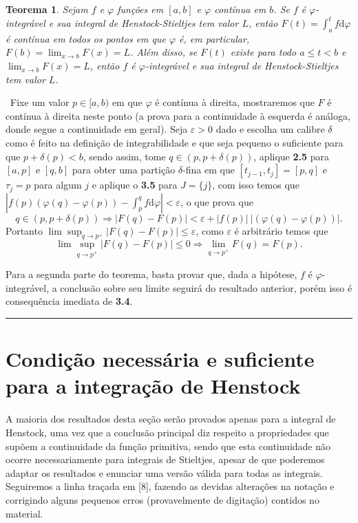 \documentclass[12pt, a4paper]{article}
\newtheorem{thrm}[mydef]{Teorema}
\def\dem{\par\smallbreak\noindent {\textit{ Demonstração:}} \ }
\def\eop{\hfill\rule{2.5mm}{2.5mm}}
\theoremstyle{definition}
\begin{document}
\begin{thrm}
	
	Sejam $f$ e $\varphi$ funções em $[a,b]$ e $\varphi$ contínua em $b$. Se $f$ é $\varphi$-integrável e sua integral de Henstock-Stieltjes tem valor $L$, então $F(t)=\int_a^t f  \text{d}\varphi $ é contínua em todos os pontos em que $\varphi$ é, em particular, $F(b)=\lim_{x\rightarrow b}F(x)=L$. Além disso, se $F(t)$ existe para todo $a\leq t <b$ e $\lim_{x\rightarrow b}F(x)=L$, então $f$ é  $\varphi$-integrável e sua integral de Henstock-Stieltjes tem valor $L$.  
	
\end{thrm}

\dem Fixe um valor $p\in [a,b)$ em que $\varphi$ é contínua à direita, mostraremos que $F$ é contínua à direita neste ponto (a prova para a continuidade à esquerda é análoga, donde segue a continuidade em geral). Seja $\varepsilon >0$ dado e escolha um calibre $\delta$ como é feito na definição de integrabilidade e que seja pequeno o suficiente para que $p+\delta(p)<b$, sendo assim, tome $q\in (p,p+\delta(p))$, aplique \textbf{2.5} para $[a,p]$ e $[q,b]$ para obter uma partição $\delta$-fina em que $[t_{j-1},t_j]=[p,q]$ e $\tau_j = p$ para algum $j$ e aplique o \textbf{3.5} para $J=\{j\}$, com isso temos que $\left|f(p)(\varphi(q)-\varphi(p)) - \int_p^q f  \text{d}\varphi \right| <\varepsilon $, o que prova que $$q\in (p,p+\delta(p)) \Rightarrow |F(q)-F(p)|<\varepsilon + |f(p)| \ |(\varphi(q)-\varphi(p))|.$$ Portanto $\lim \sup_{q\rightarrow p^+} |F(q)-F(p)|\leq \varepsilon$, como $\varepsilon$ é arbitrário temos que $$\lim \sup_{q\rightarrow p^+} |F(q)-F(p)|\leq 0 \Rightarrow \lim_{q\rightarrow p^+} F(q)=F(p).$$

Para a segunda parte do teorema, basta provar que, dada a hipótese, $f$ é $\varphi$-integrável, a conclusão sobre seu limite seguirá do resultado anterior, porém isso é consequência imediata de \textbf{3.4}.  \eop  

\section{Condição necessária e suficiente para a integração de Henstock}

A maioria dos resultados desta seção serão provados apenas para a integral de Henstock, uma vez que a conclusão principal diz respeito a propriedades que supõem a continuidade da função primitiva, sendo que esta continuidade não ocorre necessariamente para integrais de Stieltjes, apesar de que poderemos adaptar os resultados e enunciar uma versão válida para todas as integrais. Seguiremos a linha traçada em [8], fazendo as devidas alterações na notação e corrigindo alguns pequenos erros (provavelmente de digitação) contidos no material. 
\end{document}
